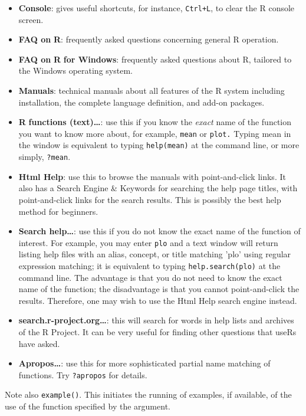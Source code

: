 \documentclass[english]{article}
\begin{document}
\begin{itemize}
\item \textbf{Console}: gives useful shortcuts, for instance, \texttt{Ctrl+L},
to clear the \textsf{R} console screen.
\item \textbf{FAQ on }\textsf{\textbf{R}}: frequently asked questions concerning
general \textsf{R} operation.
\item \textbf{FAQ on }\textsf{\textbf{R}}\textbf{ for Windows}: frequently
asked questions about \textsf{R}, tailored to the Windows operating
system.
\item \textbf{Manuals}: technical manuals about all features of the \textsf{R}
system including installation, the complete language definition, and
add-on packages.
\item \textsf{\textbf{R}}\textbf{ functions (text)\ldots{}}: use this if
you know the \emph{exact} name of the function you want to know more
about, for example, \texttt{mean} or \texttt{plot.} Typing mean in
the window is equivalent to typing \texttt{help(\textquotedbl{}mean\textquotedbl{})}
at the command line, or more simply, \texttt{?mean}.
\item \textbf{Html Help}: use this to browse the manuals with point-and-click
links. It also has a Search Engine \& Keywords for searching the help
page titles, with point-and-click links for the search results. This
is possibly the best help method for beginners.
\item \textbf{Search help\ldots{}}: use this if you do not know the exact
name of the function of interest. For example, you may enter \texttt{plo}
and a text window will return listing help files with an alias, concept,
or title matching 'plo' using regular expression matching; it is equivalent
to typing \texttt{help.search(\textquotedbl{}plo\textquotedbl{})}
at the command line. The advantage is that you do not need to know
the exact name of the function; the disadvantage is that you cannot
point-and-click the results. Therefore, one may wish to use the Html
Help search engine instead.
\item \textbf{search.r-project.org\ldots{}}: this will search for words
in help lists and archives of the \textsf{R} Project. It can be very
useful for finding other questions that useRs have asked.
\item \textbf{Apropos\ldots{}}: use this for more sophisticated partial
name matching of functions. Try \texttt{?apropos} for details.
\end{itemize}
Note also \texttt{example()}. This initiates the running of examples,
if available, of the use of the function specified by the argument.
\end{document}
